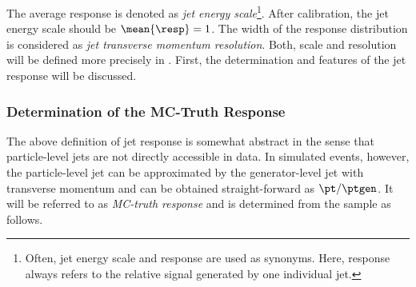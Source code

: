 The average response is denoted as \textit{jet energy scale}\footnote{Often, jet energy scale and response are used as synonyms. Here, response always refers to the relative signal generated by one individual jet.}.
After calibration, the jet energy scale should be \mbox{$\mean{\resp} = 1$}.
The width of the response distribution is considered as \textit{jet transverse momentum resolution}.
Both, scale and resolution will be defined more precisely in .
First, the determination and features of the jet response will be discussed.


\subsubsection{Determination of the MC-Truth Response} \label{sec:Jets:JEC:Response:MCTruth}
The above definition of jet response is somewhat abstract in the sense that particle-level jets are not directly accessible in data.
In simulated events, however, the particle-level jet can be approximated by the generator-level jet with transverse momentum \ptgen and \resp can be obtained straight-forward as \mbox{$\pt/\ptgen$}.
It will be referred to as \textit{MC-truth response} and is determined from the \pythia sample as follows.

